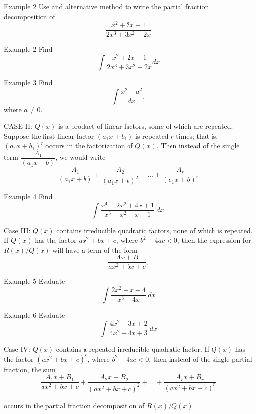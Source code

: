 \documentclass{beamer}
\begin{document}
\begin{frame}{Example 2}
    Use and alternative method to write the partial fraction decomposition of \[\dfrac{x^2 +2x -1}{2x^3+3x^2-2x}\]
    \end{frame}

\begin{frame}{Example 2}
Find \[\int \dfrac{x^2 +2x -1}{2x^3+3x^2-2x}dx\]
\end{frame}

\begin{frame}{Example 3}
Find \[\int \dfrac{x^2-a^2}{dx},\] where \(a \ne 0\).
\end{frame}

\begin{frame}{CASE II: \(Q(x)\) is a product of linear factors, some of which are repeated.}
Suppose the first linear factor \((a_1 x+b_1)\) is repeated \(r\) times; that is, \((a_1 x +b_1)^r\) occurs in the factorization of \(Q(x)\). Then instead of the single term \(\dfrac{A_1}{(a_1 x+b)}\), we would write 
\[\dfrac{A_1}{(a_1 x+b)}+\dfrac{A_2}{(a_1 x+b)^2}+\dots + \dfrac{A_r}{(a_1 x+b)^r}\]
\end{frame}

\begin{frame}{Example 4}
Find \[\int \dfrac{x^4 -2x^2 +4x +1}{x^3 -x^2 -x+1}~dx.\]
\end{frame}

\begin{frame}{Case III: \(Q(x)\) contains irreducible quadratic factors, none of which is repeated. }
If \(Q(x)\) has the factor \(ax^2 +bx +c\), where \(b^2 -4ac <0\), then the expression for \(R(x)/Q(x)\) will have a term of the form \[\dfrac{Ax+B}{ax^2 +bx +c},\] 
\end{frame}

\begin{frame}{Example 5}
Evaluate \[\int \dfrac{2x^2 -x +4}{x^3+4x}~dx\]
\end{frame}

\begin{frame}{Example 6}
Evaluate \[\int \dfrac{4x^2 -3x +2}{4x^2-4x+3}~dx\]
\end{frame}

\begin{frame}{Case IV: \(Q(x)\) contains a repeated irreducible quadratic factor.}
If \(Q(x)\) has the factor \((ax^2+bx+c)^r\), where \(b^2 -4ac<0\), then instead of the single partial fraction, the sum \[\dfrac{A_1x +B_1}{ax^2+bx+c}+\dfrac{A_2x +B_2}{(ax^2+bx+c)^2}+\dots+\dfrac{A_rx +B_r}{(ax^2+bx+c)^r}\]

occurs in the partial fraction decomposition of \(R(x)/Q(x)\).
\end{frame}
\end{document}

